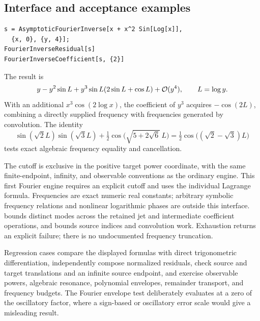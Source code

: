 \subsection{Interface and acceptance examples}

\begin{lstlisting}
s = AsymptoticFourierInverse[x + x^2 Sin[Log[x]],
  {x, 0}, {y, 4}];
FourierInverseResidual[s]
FourierInverseCoefficient[s, {2}]
\end{lstlisting}
The result is
\[
 y-y^2\sin L+y^3\sin L(2\sin L+\cos L)+\mathcal O(y^4),
 \qquad L=\log y.
\]
With an additional $x^3\cos(2\log x)$, the coefficient of $y^3$ acquires
$-\cos(2L)$, combining a directly supplied frequency with frequencies
generated by convolution. The identity
\[
 \sin(\sqrt2L)\sin(\sqrt3L)
 +\tfrac12\cos\!\bigl(\sqrt{5+2\sqrt6}\,L\bigr)
 =\tfrac12\cos\!\bigl((\sqrt2-\sqrt3)L\bigr)
\]
tests exact algebraic frequency equality and cancellation.

The cutoff is exclusive in the positive target power coordinate, with the
same finite-endpoint, infinity, and observable conventions as the ordinary
engine. This first Fourier engine requires an explicit cutoff and uses the
individual Lagrange formula. Frequencies are exact numeric real constants;
arbitrary symbolic frequency relations and nonlinear logarithmic phases are
outside this interface.  bounds distinct modes across
the retained jet and intermediate coefficient operations, and
 bounds source indices and convolution work. Exhaustion
returns an explicit failure; there is no undocumented frequency truncation.

Regression cases compare the displayed formulas with direct trigonometric
differentiation, independently compose normalized residuals, check source and
target translations and an infinite source endpoint, and exercise observable
powers, algebraic resonance, polynomial envelopes, remainder transport, and
frequency budgets. The Fourier envelope test deliberately evaluates at a zero
of the oscillatory factor, where a sign-based or oscillatory error scale would
give a misleading result.
